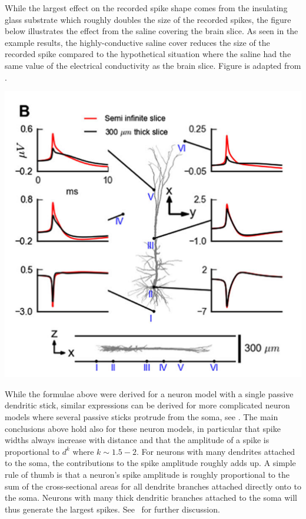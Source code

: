 While the largest effect on the recorded spike shape comes from the insulating 
glass substrate which roughly doubles the size of the recorded spikes, the figure below illustrates the 
effect from the saline covering the brain slice. As seen in the example results, the highly-conductive 
saline cover reduces the size of the recorded spike compared to the hypothetical 
situation where the saline had the same value of the electrical conductivity as the brain slice.
Figure is adapted from \citet{Ness2015}.
%
\begin{center}
\includegraphics{Figures/Spikes/Spikes-MEA-2-w43-r300}
\end{center}
%


While the formulae above were derived for a neuron model with a single passive dendritic stick, similar expressions can be derived for 
more complicated neuron models where several passive sticks protrude from the soma, see \citet{Pettersen2008}.
The main conclusions above hold also for these neuron models, in particular that spike widths always increase with distance and that
the amplitude of a spike is proportional to $d^{k}$ where $k\sim1.5-2$. For neurons with many dendrites attached to the 
soma, the contributions to the spike amplitude roughly adds up. A simple rule of thumb is that a neuron's spike amplitude is 
roughly proportional to the sum of the cross-sectional areas for all dendrite branches attached directly onto to the soma. Neurons with many thick
dendritic branches attached to the soma will thus generate the largest spikes. See~\citet{Pettersen2008} for further discussion.


